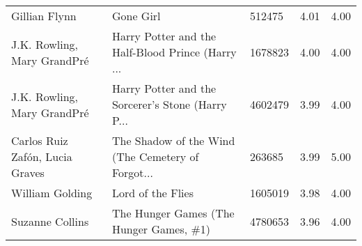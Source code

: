 \begin{tabular}{p{4cm}p{5cm}lll}
                           Gillian Flynn &                                          Gone Girl &         512475 &   4.01 &    4.00 \\
             J.K. Rowling, Mary GrandPré &  Harry Potter and the Half-Blood Prince (Harry ... &        1678823 &   4.00 &    4.00 \\
             J.K. Rowling, Mary GrandPré &  Harry Potter and the Sorcerer's Stone (Harry P... &        4602479 &   3.99 &    4.00 \\
         Carlos Ruiz Zafón, Lucia Graves &  The Shadow of the Wind (The Cemetery of Forgot... &         263685 &   3.99 &    5.00 \\
                         William Golding &                                  Lord of the Flies &        1605019 &   3.98 &    4.00 \\
                         Suzanne Collins &            The Hunger Games (The Hunger Games, \#1) &        4780653 &   3.96 &    4.00 \\
\bottomrule
\end{tabular}

